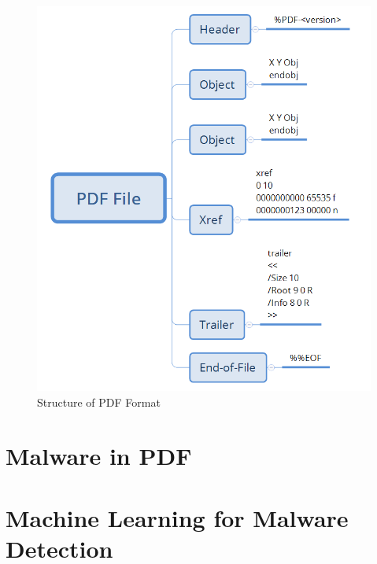 \begin{figure}[H]
	\centerline{\includegraphics[scale=0.4]{figures/PDFSkeleton.png}}  
	\caption{Structure of PDF Format \cite{winInternals}}
	\label{pdfSkeleton}
\end{figure}


\section{Malware in PDF}
\label{section:malwareInPDF}

\section{Machine Learning for Malware Detection}
\label{section:mlForMalware}

